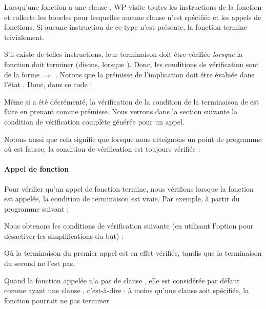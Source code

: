 Lorsqu'une fonction a une clause , WP visite toutes les
instructions de la fonction et collecte les boucles pour lesquelles aucune
clause  n'est spécifiée et les appels de fonctions. Si
aucune instruction de ce type n'est présente, la fonction termine trivialement.




S'il existe de telles instructions, leur terminaison doit être vérifiée
\emph{lorsque} la fonction doit terminer (disons, lorsque ). Donc,
les conditions de vérification sont de la forme
 $\Rightarrow$ .
Notons que la prémisse de l'implication doit être évaluée dans l'état
. Donc, dans ce code :




Même si  a été décrémenté, la vérification de la condition de
la terminaison de  est faite en prenant
 comme prémisse. Nous verrons dans
la section suivante la condition de vérification complète générée pour un appel.


Notons aussi que cela signifie que lorsque nous atteignons un point de programme
où  est fausse, la condition de vérification est toujours
vérifiée :




\paragraph{Appel de fonction}


Pour vérifier qu'un appel de fonction termine, nous vérifions lorsque la
fonction est appelée, la condition de terminaison est vraie. Par exemple, à
partir du programme suivant :




Nous obtenons les conditions de vérification suivante (en utilisant l'option
 pour désactiver les simplifications du but) :






Où la terminaison du premier appel est en effet vérifiée, tandis que la
terminaison du second ne l'est pas.


Quand la fonction appelée n'a pas de clause , elle est
considérée par défaut comme ayant une clause ,
c'est-à-dire : à moins qu'une clause  soit spécifiée,
la fonction pourrait ne pas terminer.



